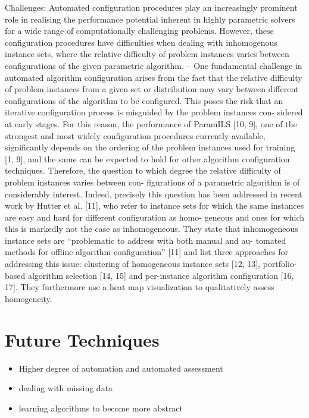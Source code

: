 \documentclass{article}
\begin{document}
Challenges:
\cite{Schneider2012homogeneity}
Automated configuration procedures play an increasingly prominent role in realising the performance potential inherent in highly parametric solvers for a wide range of computationally challenging problems. However, these configuration procedures have difficulties when dealing with inhomogenous instance sets, where the relative difficulty of problem instances varies between configurations of the given parametric algorithm. 
--
One fundamental challenge in automated algorithm configuration arises from the fact that the relative difficulty of problem instances from a given set or distribution may vary between different configurations of the algorithm to be configured. This poses the risk that an iterative configuration process is misguided by the problem instances con- sidered at early stages. For this reason, the performance of ParamILS [10, 9], one of the strongest and most widely configuration procedures currently available, significantly depends on the ordering of the problem instances used for training [1, 9], and the same can be expected to hold for other algorithm configuration techniques. Therefore, the question to which degree the relative difficulty of problem instances varies between con- figurations of a parametric algorithm is of considerably interest. Indeed, precisely this question has been addressed in recent work by Hutter et al. [11], who refer to instance sets for which the same instances are easy and hard for different configuration as homo- geneous and ones for which this is markedly not the case as inhomogeneous. They state that inhomogeneous instance sets are “problematic to address with both manual and au- tomated methods for offline algorithm configuration” [11] and list three approaches for addressing this issue: clustering of homogeneous instance sets [12, 13], portfolio-based algorithm selection [14, 15] and per-instance algorithm configuration [16, 17]. They furthermore use a heat map visualization to qualitatively assess homogeneity.




\section{Future Techniques}\label{sec:future}
\begin{itemize}
	\item Higher degree of automation and automated assessment
	\item dealing with missing data
	\item learning algorithms to become more abstract
\end{itemize}
\end{document}
